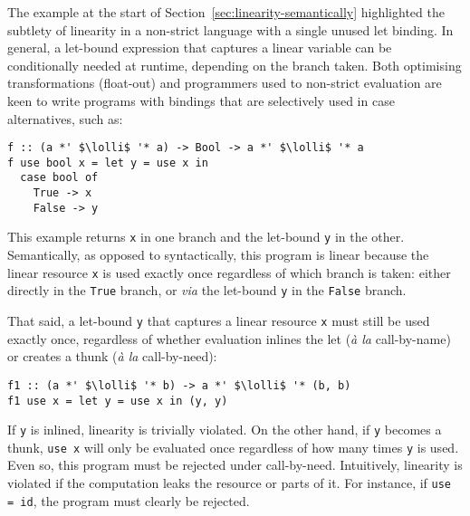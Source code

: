 \documentclass[acmsmall,review,anonymous,screen]{acmart}
\newcommand{\lolli}{\multimap}
\begin{document}
The example at the start of Section~\ref{sec:linearity-semantically}
highlighted the subtlety of linearity in a non-strict language with
a single unused let binding.
%
In general, a let-bound expression that captures a linear variable
can be conditionally needed at runtime, depending on the branch taken.
Both optimising transformations (float-out) and programmers used to
non-strict evaluation are keen to write programs with bindings that are selectively
used in case alternatives, such as:
%
\begin{notyet}
\begin{lstlisting}
f :: (a *' $\lolli$ '* a) -> Bool -> a *' $\lolli$ '* a
f use bool x = let y = use x in
  case bool of
    True -> x 
    False -> y
\end{lstlisting}
\end{notyet}
%
This example returns \lstinline{x} in one branch and the let-bound
\lstinline{y} in the other. Semantically, as opposed to syntactically, this
program is linear %
because the linear resource \lstinline{x} is used exactly once regardless of which branch is
taken: either directly in the \lstinline{True} branch, or \emph{via} the
let-bound \lstinline{y} in the \lstinline{False} branch.

That said, a let-bound \lstinline{y} that captures a linear resource
\lstinline{x} must still be used exactly once, regardless of whether evaluation
inlines the let (\emph{à la} call-by-name) or creates a thunk (\emph{à
  la} call-by-need):
%
%
\begin{noway}
\begin{lstlisting}
f1 :: (a *' $\lolli$ '* b) -> a *' $\lolli$ '* (b, b)
f1 use x = let y = use x in (y, y)
\end{lstlisting}
\end{noway}
%
If \lstinline{y} is inlined, linearity is trivially violated.
%
On the other hand, if \lstinline{y} becomes a thunk, \lstinline{use x} will
only be evaluated once regardless of how many times \lstinline{y} is used.
Even so, this program must be rejected under call-by-need.
%
Intuitively, linearity is violated if the computation leaks the resource or
parts of it. For instance, if \lstinline{use = id}, the program must clearly be
rejected.
%
%
%
\end{document}
